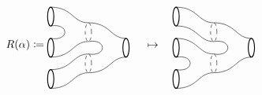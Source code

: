 \documentclass[11pt]{amsart}
\theoremstyle{remark}
\theoremstyle{definition}
\begin{document}
\[
%
%
R(\alpha) \coloneqq
\raisebox{-0.5\height}{%
\begin{tikzpicture}
\begin{scope}
\draw [dashed]  (1.6,-0.2) ellipse (0.1 and 0.3);
\draw [thick]  (0.4,0.3) ellipse (0.1 and 0.3);
\draw [thick] (0.4,-0.7) ellipse (0.1 and 0.3);
\draw (0.4,0) .. controls (1,0.1) and (1,-0.5) .. (0.4,-0.4);
\draw (0.4,0.6) .. controls (1.1,0.6) and (1.1,0.1) .. (1.6,0.1);
\draw (0.4,-1) .. controls (1.1,-1) and (1.1,-0.5) .. (1.6,-0.5);
\end{scope}
\begin{scope}[shift={(1.2,-0.5)}]
\draw [thick]  (1.6,-0.2) ellipse (0.1 and 0.3);
\draw (0.4,0) .. controls (1,0.1) and (1,-0.5) .. (0.4,-0.4);
\draw (0.4,0.6) .. controls (1.1,0.6) and (1.1,0.1) .. (1.6,0.1);
\draw (0.4,-1) .. controls (1.1,-1) and (1.1,-0.5) .. (1.6,-0.5);
\end{scope}
\begin{scope}
\draw [thick]  (0.4,-1.7) ellipse (0.1 and 0.3);
\draw [dashed]  (1.6,-1.2) ellipse (0.1 and 0.3);
\draw (0.4,-1.4) .. controls (1.1,-1.4) and (1.1,-0.9) .. (1.6,-0.9);
\draw (0.4,-2) .. controls (1.1,-2) and (1.1,-1.5) .. (1.6,-1.5);
\end{scope}
\end{tikzpicture}
}
%
%
%
\quad \mapsto \quad
%
%
\raisebox{-0.5\height}{%
\begin{tikzpicture}
\begin{scope}[shift={(0,-1)}]
\draw [dashed]  (1.6,-0.2) ellipse (0.1 and 0.3);
\draw [thick]  (0.4,0.3) ellipse (0.1 and 0.3);
\draw [thick] (0.4,-0.7) ellipse (0.1 and 0.3);
\draw (0.4,0) .. controls (1,0.1) and (1,-0.5) .. (0.4,-0.4);
\draw (0.4,0.6) .. controls (1.1,0.6) and (1.1,0.1) .. (1.6,0.1);
\draw (0.4,-1) .. controls (1.1,-1) and (1.1,-0.5) .. (1.6,-0.5);
\end{scope}
\begin{scope}[shift={(1.2,-0.5)}]
\draw [thick]  (1.6,-0.2) ellipse (0.1 and 0.3);
\draw (0.4,0) .. controls (1,0.1) and (1,-0.5) .. (0.4,-0.4);
\draw (0.4,0.6) .. controls (1.1,0.6) and (1.1,0.1) .. (1.6,0.1);
\draw (0.4,-1) .. controls (1.1,-1) and (1.1,-0.5) .. (1.6,-0.5);
\end{scope}
\begin{scope}[shift={(0,2)}]
\draw [thick]  (0.4,-1.7) ellipse (0.1 and 0.3);
\draw [dashed]  (1.6,-2.2) ellipse (0.1 and 0.3);
\draw (0.4,-1.4) .. controls (1.1,-1.4) and (1.1,-1.9) .. (1.6,-1.9);
\draw (0.4,-2) .. controls (1.1,-2) and (1.1,-2.5) .. (1.6,-2.5);
\end{scope}
\end{tikzpicture}
}
\]
\end{document}

